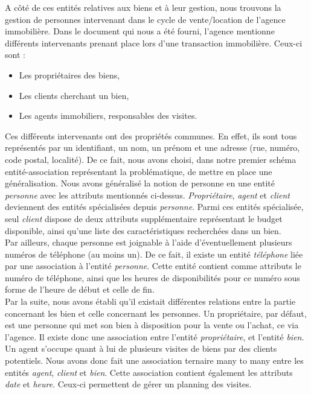 A côté de ces entités relatives aux biens et à leur gestion, nous trouvons la gestion de personnes intervenant dans le cycle de vente/location de l'agence immobilière. Dans le document qui nous a été fourni, l'agence mentionne différents intervenants prenant place lors d'une transaction immobilière. Ceux-ci sont : 
\begin{itemize}
	\item Les propriétaires des biens,
	\item Les clients cherchant un bien,
	\item Les agents immobiliers, responsables des visites.\\
\end{itemize}
Ces différents intervenants ont des propriétés communes. En effet, ils sont tous représentés par un identifiant, un nom, un prénom et une adresse (rue, numéro, code postal, localité). De ce fait, nous avons choisi, dans notre premier schéma entité-association représentant la problématique, de mettre en place une généralisation. Nous avons généralisé la notion de personne en une entité \textit{personne} avec les attributs mentionnés ci-dessus. \textit{Propriétaire}, \textit{agent} et \textit{client} deviennent des entités spécialisées depuis \textit{personne}. Parmi ces entités spécialisée, seul \textit{client} dispose de deux attributs supplémentaire représentant le budget disponible, ainsi qu'une liste des caractéristiques recherchées dans un bien.\\

Par ailleurs, chaque personne est joignable à l'aide d'éventuellement plusieurs numéros de téléphone (au moins un). De ce fait, il existe un entité \textit{téléphone} liée par une association à l'entité \textit{personne}. Cette entité contient comme attributs le numéro de téléphone, ainsi que les heures de disponibilités pour ce numéro sous forme de l'heure de début et celle de fin.\\

Par la suite, nous avons établi qu'il existait différentes relations entre la partie concernant les bien et celle concernant les personnes. Un propriétaire, par défaut, est une personne qui met son bien à disposition pour la vente ou l'achat, ce via l'agence. Il existe donc une association entre l'entité \textit{propriétaire}, et l'entité \textit{bien}. Un agent s'occupe quant à lui de plusieurs visites de biens par des clients potentiels. Nous avons donc fait une association ternaire many to many entre les entités \textit{agent}, \textit{client} et \textit{bien}. Cette association contient également les attributs \textit{date} et \textit{heure}. Ceux-ci permettent de gérer un planning des visites.\\

